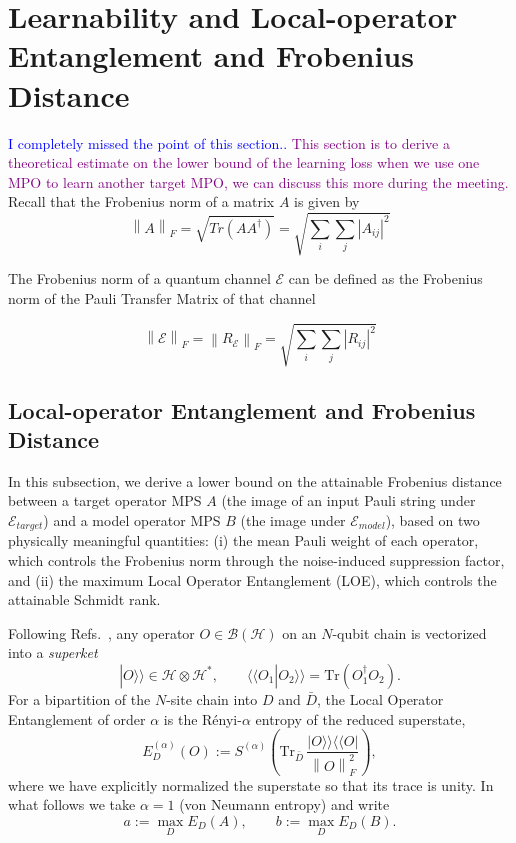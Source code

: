 \documentclass[%
 reprint,
superscriptaddress,
 amsmath,amssymb,
 aps,
]{revtex4-2}
\newcommand{\E}{\mathcal{E}}
\newcommand{\norm}[1]{\left\lVert#1\right\rVert}
\newcommand{\yijian}[1]{\textcolor{blue}{#1}}
\newcommand{\simba}[1]{\textcolor{purple}{#1}}
\begin{document}
\section{Learnability and Local-operator Entanglement and Frobenius Distance}
\label{sec:learnability_and_entanglement_entropy}
\yijian{I completely missed the point of this section..}
\simba{This section is to derive a theoretical estimate on the lower bound of the learning loss when we use one MPO to learn another target MPO, we can discuss this more during the meeting.}
Recall that the Frobenius norm of a matrix $A$ is given by 
\begin{equation}
\norm{A}_F=\sqrt{Tr(AA^\dagger)}=\sqrt{\sum_i\sum_j|A_{ij}|^2}
\end{equation}


The Frobenius norm of a quantum channel $\E$ can be defined as the Frobenius norm of the Pauli Transfer Matrix of that channel

\begin{equation}
    \norm{\E}_F=\norm{R_{\E}}_F=\sqrt{\sum_i\sum_j|R_{ij}|^2}
\end{equation}

\subsection{Local-operator Entanglement and Frobenius Distance}
\label{sec:LOE_Frobenius}

In this subsection, we derive a lower bound on the attainable Frobenius distance between a target operator MPS $A$ (the image of an input Pauli string under $\E_{target}$) and a model operator MPS $B$ (the image under $\E_{model}$), based on two physically meaningful quantities: (i) the mean Pauli weight of each operator, which controls the Frobenius norm through the noise-induced suppression factor, and (ii) the maximum Local Operator Entanglement (LOE), which controls the attainable Schmidt rank.

Following Refs.~\cite{zanardi2001entanglement,prosen2007operator}, any operator $O\in\mathcal{B}(\mathcal{H})$ on an $N$-qubit chain is vectorized into a \emph{superket}
\begin{equation}
    |O\rangle\rangle \in \mathcal{H}\otimes\mathcal{H}^*,\qquad \langle\langle O_1|O_2\rangle\rangle = \mathrm{Tr}(O_1^\dagger O_2).
\end{equation}
For a bipartition of the $N$-site chain into $D$ and $\bar D$, the Local Operator Entanglement of order $\alpha$ is the R\'enyi-$\alpha$ entropy of the reduced superstate,
\begin{equation}
    E^{(\alpha)}_{D}(O) := S^{(\alpha)}\!\left(\mathrm{Tr}_{\bar{D}}\,\frac{|O\rangle\rangle\langle\langle O|}{\norm{O}_F^2}\right),
\end{equation}
where we have explicitly normalized the superstate so that its trace is unity. In what follows we take $\alpha=1$ (von Neumann entropy) and write
\begin{equation}
    a := \max_D E_D(A),\qquad b := \max_D E_D(B).
\end{equation}
\end{document}
